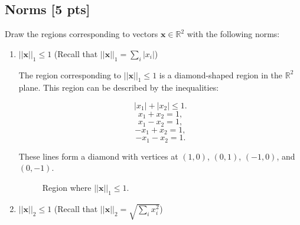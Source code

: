 \documentclass[letter]{article}
\theoremstyle{definition}
\newcommand{\RR}{\mathbb{R}}
\newenvironment{soln}{
	\leavevmode\color{black}\ignorespaces
}{}
\begin{document}
	\subsection{Norms [5 pts]}
	Draw the regions corresponding to vectors $\mathbf{x}\in\RR^2$ with the following norms:
	\begin{enumerate}
		\item 	$||\mathbf{x}||_1\leq 1$ (Recall that $||\mathbf{x}||_1 = \sum_i |x_i|$)


	\begin{soln}
                The region corresponding to $||\mathbf{x}||_1 \leq 1$ is a diamond-shaped region in the $\mathbb{R}^2$ plane. This region can be described by the inequalities:
            
                \[
                |x_1| + |x_2| \leq 1.
                \]
                \[
                x_1 + x_2 = 1,
                \]
                \[
                x_1 - x_2 = 1,
                \]
                \[
                -x_1 + x_2 = 1,
                \]
                \[
                -x_1 - x_2 = 1.
                \]
            
                These lines form a diamond with vertices at $(1, 0)$, $(0, 1)$, $(-1, 0)$, and $(0, -1)$.
            
                \begin{figure}[h!]
                    \centering
                    \caption{Region where $||\mathbf{x}||_1 \leq 1$.}
                    \label{fig:norm1}
                \end{figure}
            \end{soln}
		
		\item 	$||\mathbf{x}||_2 \leq 1$ (Recall that $||\mathbf{x}||_2 =\sqrt{\sum_i x_i^2}$)
			

\end{enumerate}
\end{document}
